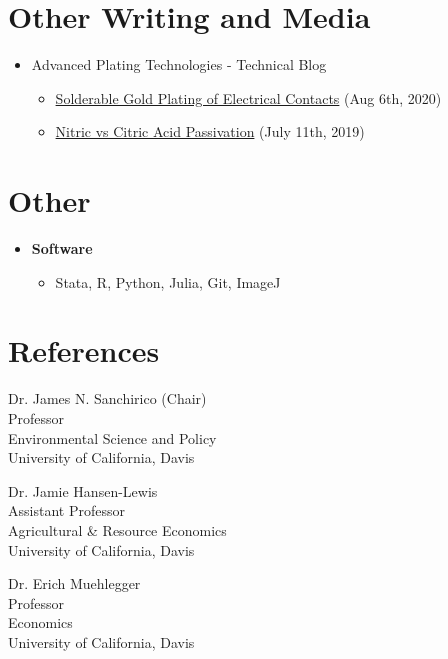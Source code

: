 \documentclass{article}[12]
\begin{document}
\section{Other Writing and Media}
\begin{itemize}
    \item Advanced Plating Technologies - Technical Blog
    \begin{itemize}
                \item \href{https://advancedplatingtech.com/blog/solderable-gold-plating-of-electrical-contacts/}{Solderable Gold Plating of Electrical Contacts} (Aug 6th, 2020)
    
                \item \href{https://advancedplatingtech.com/blog/nitric-vs-citric-acid-passivation/}{Nitric vs Citric Acid Passivation} (July 11th, 2019)
    \end{itemize}
\end{itemize}

\section{Other}
\begin{itemize}
    \item \textbf{Software}
    \begin{itemize}
        \item Stata, R, Python, Julia, Git, ImageJ
    \end{itemize}
\end{itemize}

\section{References}
\begin{minipage}[t]{.48\textwidth}
Dr. James N. Sanchirico (Chair)\\
Professor \\
Environmental Science and Policy \\
University of California, Davis \\
\end{minipage}
\hfill
\begin{minipage}[t]{.48\textwidth}
Dr. Jamie Hansen-Lewis \\
Assistant Professor \\
Agricultural \& Resource Economics \\
University of California, Davis \\
\end{minipage}

\vspace{1em}

\begin{minipage}[t]{.48\textwidth}
Dr. Erich Muehlegger\\
Professor \\
Economics \\
University of California, Davis \\
\end{minipage}




\thispagestyle{laststyle}
\end{document}
